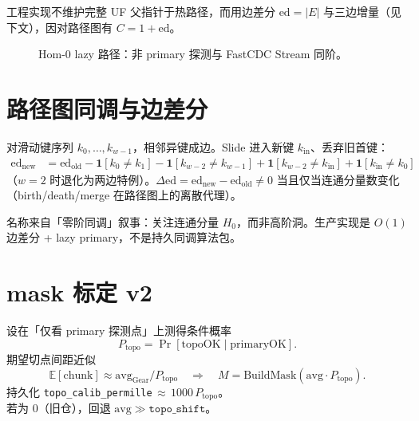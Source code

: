 工程实现不维护完整 UF 父指针于热路径，而用边差分 $\mathrm{ed}=|E|$ 与三边增量（见下文），因对路径图有 $C=1+\mathrm{ed}$。

\begin{figure}[htbp]
\centering
{}
\caption{Hom-0 lazy 路径：非 primary 探测与 FastCDC Stream 同阶。}
\label{fig:hom-flow}
\end{figure}

\section{路径图同调与边差分}

对滑动键序列 $k_0,\ldots,k_{w-1}$，相邻异键成边。Slide 进入新键 $k_{\mathrm{in}}$、丢弃旧首键：
\begin{align}
\mathrm{ed}_{\mathrm{new}}
&= \mathrm{ed}_{\mathrm{old}}
 - \mathbf{1}[k_0\neq k_1]
 - \mathbf{1}[k_{w-2}\neq k_{w-1}]
 + \mathbf{1}[k_{w-2}\neq k_{\mathrm{in}}]
 + \mathbf{1}[k_{\mathrm{in}}\neq k_0]
\end{align}
（$w=2$ 时退化为两边特例）。$\Delta\mathrm{ed}=\mathrm{ed}_{\mathrm{new}}-\mathrm{ed}_{\mathrm{old}}\neq 0$ 当且仅当连通分量数变化（birth/death/merge 在路径图上的离散代理）。

\begin{designbox}
名称来自「零阶同调」叙事：关注连通分量 $H_0$，而非高阶洞。生产实现是 $O(1)$ 边差分 + lazy primary，不是持久同调算法包。
\end{designbox}

\section{mask 标定 v2}

设在「仅看 primary 探测点」上测得条件概率
\begin{equation}
P_{\mathrm{topo}}=\Pr[\mathrm{topoOK}\mid\mathrm{primaryOK}].
\end{equation}
期望切点间距近似
\begin{equation}
\mathbb{E}[\mathrm{chunk}]\approx \mathrm{avg}_{\mathrm{Gear}} / P_{\mathrm{topo}}
\quad\Rightarrow\quad
M=\mathrm{BuildMask}(\mathrm{avg}\cdot P_{\mathrm{topo}}).
\end{equation}
持久化 \texttt{topo\_calib\_permille}$\,\approx\,1000\,P_{\mathrm{topo}}$。\\
若为 0（旧仓），回退 $\mathrm{avg}\gg\texttt{topo\_shift}$。

